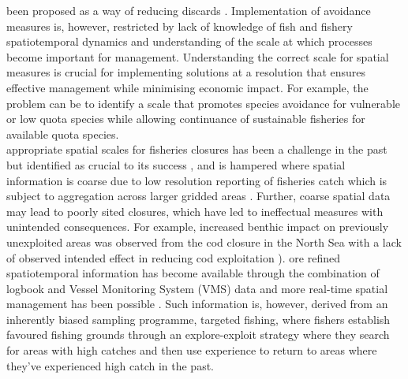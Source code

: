 \documentclass[review]{elsarticle}
\begin{document}
 been proposed as a way of reducing discards
.  
Implementation of avoidance measures is, however, restricted by lack of
knowledge of fish and fishery spatiotemporal dynamics and understanding of the
scale at which processes become important for management. Understanding the
correct scale for spatial measures is crucial for implementing solutions at a
resolution that ensures effective management \citep{Dunn2016} while minimising
economic impact.  For example, the problem can be to identify a scale that
promotes species avoidance for vulnerable or low quota species while allowing
continuance of sustainable fisheries for available quota species.\\

 appropriate
spatial scales for fisheries closures has been a challenge in the past but
identified as crucial to its success \citep{Costello2010, Dunn2016}, and is
hampered where spatial information is coarse due to low resolution reporting of
fisheries catch which is subject to aggregation across larger gridded areas
\citep{Branch2005}. Further, coarse spatial data may lead to poorly sited closures,
which have led to ineffectual measures with unintended consequences.  For
example, increased benthic impact on previously unexploited areas was observed
from the cod closure in the North Sea with a lack of observed intended effect
in reducing cod exploitation \citep{Rijnsdorp2001,Dinmore2003}).
ore refined spatiotemporal information has
 become available through the combination of logbook and
Vessel Monitoring System (VMS) data \citep{Lee2010, Bastardie2010,
	Gerritsen2012, Mateo2016} and more real-time spatial management has
been possible \citep[e.g.][]{Holmes2011}.  Such information is, however,
derived from an inherently biased sampling programme, targeted fishing, where
fishers establish favoured fishing grounds through an explore-exploit strategy
\citep{Bailey2018} where they search for areas with high catches and then use
experience to return to areas where they've experienced high catch in the past.
\\ 
\end{document}
